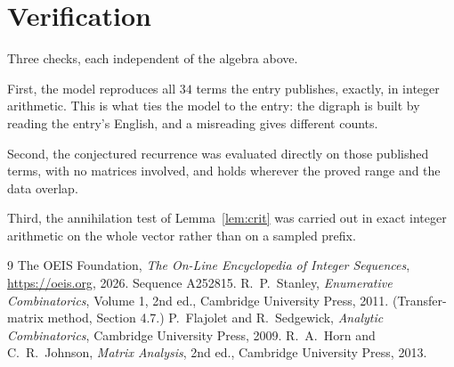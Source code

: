 \documentclass[11pt,a4paper]{article}
\theoremstyle{plain}
\theoremstyle{definition}
\begin{document}
\section{Verification}

Three checks, each independent of the algebra above.

First, the model reproduces all $34$ terms the entry publishes, exactly, in integer
arithmetic. This is what ties the model to the entry: the digraph is built by reading the
entry's English, and a misreading gives different counts.

Second, the conjectured recurrence was evaluated directly on those published terms, with no
matrices involved, and holds wherever the proved range and the data overlap.

Third, the annihilation test of Lemma~\ref{lem:crit} was carried out in exact integer
arithmetic on the whole vector rather than on a sampled prefix.

\begin{thebibliography}{9}
 The OEIS Foundation, \emph{The On-Line Encyclopedia of Integer
Sequences}, \url{https://oeis.org}, 2026. Sequence A252815.
 R.~P.~Stanley, \emph{Enumerative Combinatorics}, Volume 1, 2nd ed.,
Cambridge University Press, 2011. (Transfer-matrix method, Section 4.7.)
 P.~Flajolet and R.~Sedgewick, \emph{Analytic Combinatorics}, Cambridge
University Press, 2009.
 R.~A.~Horn and C.~R.~Johnson, \emph{Matrix Analysis}, 2nd ed., Cambridge
University Press, 2013.
\end{thebibliography}
\end{document}
